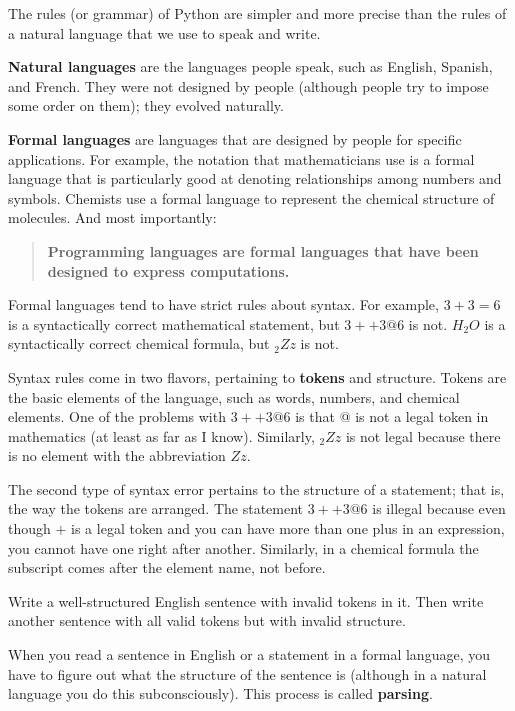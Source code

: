 \documentclass[10pt]{book}
\begin{document}
The rules (or grammar) of Python are simpler and more precise than 
the rules of a natural language that we use to speak and write.

{\bf Natural languages} are the languages people speak,
such as English, Spanish, and French.  They were not designed
by people (although people try to impose some order on them);
they evolved naturally.

{\bf Formal languages} are languages that are designed by people for
specific applications.  For example, the notation that mathematicians
use is a formal language that is particularly good at denoting
relationships among numbers and symbols.  Chemists use a formal
language to represent the chemical structure of molecules.  And
most importantly:

\begin{quote}
{\bf Programming languages are formal languages that have been
designed to express computations.}
\end{quote}

Formal languages tend to have strict rules about syntax.  For example,
$3 + 3 = 6$ is a syntactically correct mathematical statement, but 
$3 + + 3 @ 6$ is not.  $H_2O$ is a syntactically correct
chemical formula, but $_2Zz$ is not.

Syntax rules come in two flavors, pertaining to {\bf tokens} and
structure.  Tokens are the basic elements of the language, such as
words, numbers, and chemical elements.  One of the problems with $3 +
+ 3 @ 6$ is that @ is not a legal token in mathematics
(at least as far as I know).  Similarly, $_2Zz$ is not legal because
there is no element with the abbreviation $Zz$.


The second type of syntax error pertains to the structure of a
statement; that is, the way the tokens are arranged.  The statement $3
+ + 3 @ 6$ is illegal because even though $+$ is a legal token and 
you can have more than one plus in an expression, you cannot have one
right after another. 
Similarly,
in a chemical formula the subscript comes after the element name, not
before.

\begin{ex}
Write a well-structured English
sentence with invalid tokens in it.  Then write another sentence
with all valid tokens but with invalid structure.
\end{ex}

When you read a sentence in English or a statement in a formal
language, you have to figure out what the structure of the sentence is
(although in a natural language you do this subconsciously).  This
process is called {\bf parsing}.
\end{document}
